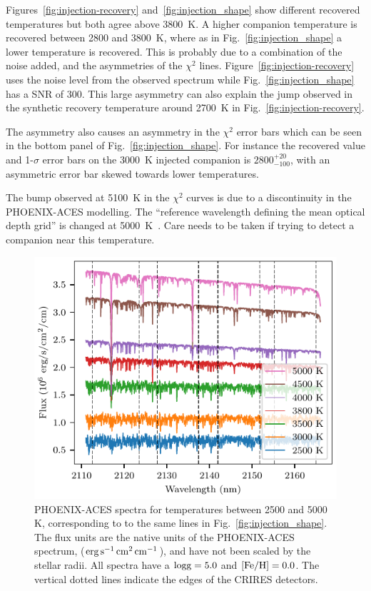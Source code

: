 \documentclass[fleqn,usenatbib]{mnras}
\begin{document}
Figures~\ref{fig:injection-recovery} and~\ref{fig:injection_shape} show different recovered temperatures but both agree above 3800~K. A higher companion temperature is recovered between 2800 and 3800~K, where as in Fig.~\ref{fig:injection_shape} a lower temperature is recovered. This is probably due to a combination of the noise added, and the asymmetries of the \(\chi^2\) lines. Figure~\ref{fig:injection-recovery} uses the noise level from the observed spectrum while Fig.~\ref{fig:injection_shape} has a SNR of 300.
This large asymmetry can also explain the jump observed in the synthetic recovery temperature around 2700~K in Fig.~\ref{fig:injection-recovery}.

The asymmetry also causes an asymmetry in the \(\chi^2\) error bars which can be seen in the bottom panel of Fig.~\ref{fig:injection_shape}. For instance the recovered value and 1-\(\sigma\) error bars on the 3000~K injected companion is \(2800 ^{+20}_{-100}\), with an asymmetric error bar skewed towards lower temperatures.

The bump observed at 5100~K in the \(\chi^2\) curves is due to a discontinuity in the PHOENIX-ACES modelling. The ``reference wavelength defining the mean optical depth grid'' is changed at 5000~K~\citep[][Sect. 2.3]{husser_new_2013}. Care needs to be taken if trying to detect a companion near this temperature.

\begin{figure}
    \centering
    \includegraphics[width=0.95\hsize]{images/fig9.pdf}
    \caption{PHOENIX-ACES spectra for temperatures between 2500 and 5000 K, corresponding to to the same lines in Fig.~\ref{fig:injection_shape}. The flux units are the native units of the PHOENIX-ACES spectrum, (\(\rm erg\,s^{-1}\,cm^{2}\,cm^{-1}\)), and have not been scaled by the stellar radii. All spectra have a \(\rm logg=5.0\) and \(\rm [Fe/H]=0.0\). The vertical dotted lines indicate the edges of the CRIRES detectors.}
    \label{fig:comp_spectra}
\end{figure}
\end{document}
